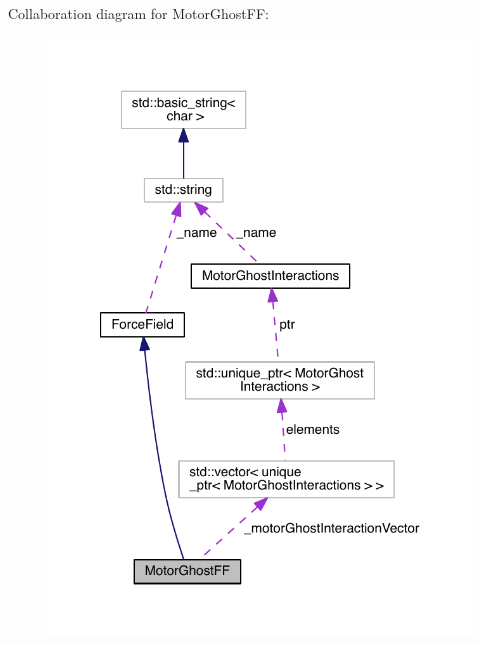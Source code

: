 Collaboration diagram for Motor\+Ghost\+F\+F\+:\nopagebreak
\begin{figure}[H]
\begin{center}
\leavevmode
\includegraphics[width=321pt]{classMotorGhostFF__coll__graph}
\end{center}
\end{figure}
